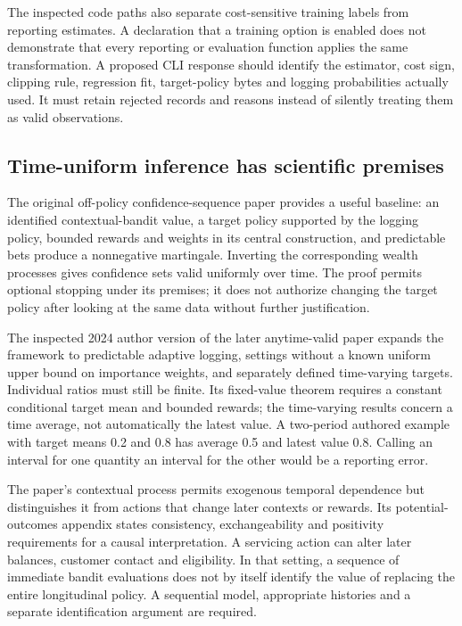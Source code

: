 The inspected code paths also separate cost-sensitive training labels from reporting estimates. A declaration that a training option is enabled does not demonstrate that every reporting or evaluation function applies the same transformation. A proposed CLI response should identify the estimator, cost sign, clipping rule, regression fit, target-policy bytes and logging probabilities actually used. It must retain rejected records and reasons instead of silently treating them as valid observations.\citep{exec24_policycxx_vw,exec24_policycxx_comparison}

\subsection{Time-uniform inference has scientific premises}
The original off-policy confidence-sequence paper provides a useful baseline: an identified contextual-bandit value, a target policy supported by the logging policy, bounded rewards and weights in its central construction, and predictable bets produce a nonnegative martingale. Inverting the corresponding wealth processes gives confidence sets valid uniformly over time. The proof permits optional stopping under its premises; it does not authorize changing the target policy after looking at the same data without further justification.\citep{exec24_policycxx_cs2021}

The inspected 2024 author version of the later anytime-valid paper expands the framework to predictable adaptive logging, settings without a known uniform upper bound on importance weights, and separately defined time-varying targets. Individual ratios must still be finite. Its fixed-value theorem requires a constant conditional target mean and bounded rewards; the time-varying results concern a time average, not automatically the latest value. A two-period authored example with target means 0.2 and 0.8 has average 0.5 and latest value 0.8. Calling an interval for one quantity an interval for the other would be a reporting error.\citep{exec24_policycxx_anytime2024,exec24_policycxx_comparison}

The paper's contextual process permits exogenous temporal dependence but distinguishes it from actions that change later contexts or rewards. Its potential-outcomes appendix states consistency, exchangeability and positivity requirements for a causal interpretation. A servicing action can alter later balances, customer contact and eligibility. In that setting, a sequence of immediate bandit evaluations does not by itself identify the value of replacing the entire longitudinal policy. A sequential model, appropriate histories and a separate identification argument are required.\citep{exec24_policycxx_anytime2024,exec24_policycxx_comparison}

